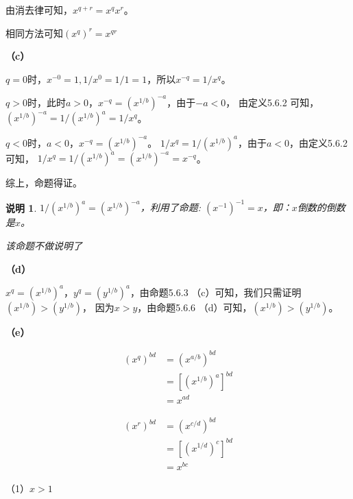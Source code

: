 \documentclass{article}
\theoremstyle{mystyle}
\newtheorem*{zremark}{说明}
\begin{document}
由消去律可知，$x^{q+r}=x^qx^r$。

相同方法可知$(x^q)^r = x^{qr}$

\textbf{（c）}

$q=0$时，$x^{-0}=1,1/x^0=1/1=1$，所以$x^{-q}=1/x^q$。

$q > 0$时，此时$a>0$，$x^{-q} = (x^{1/b})^{-a}$，由于$-a < 0$，
由定义5.6.2 可知，$(x^{1/b})^{-a} = 1/(x^{1/b})^{a} = 1/x^q$。

$q < 0$时，$a < 0$，$x^{-q} = (x^{1/b})^{-a}$。
$1/x^q = 1/(x^{1/b})^a$，由于$a<0$，由定义5.6.2 可知，
$1/x^q = 1/(x^{1/b})^a=(x^{1/b})^{-a}=x^{-q}$。

综上，命题得证。

\begin{zgraytheorem}
  \begin{zremark}
    $1/(x^{1/b})^a=(x^{1/b})^{-a}$，利用了命题: $(x^{-1})^{-1}=x$，即：$x$倒数的倒数是$x$。

    该命题不做说明了
  \end{zremark}
\end{zgraytheorem}

\textbf{（d）}

$x^q = (x^{1/b})^a$，$y^q=(y^{1/b})^a$，由命题5.6.3 （c）可知，我们只需证明$(x^{1/b})>(y^{1/b})$，
因为$x>y$，由命题5.6.6 （d）可知，$(x^{1/b})>(y^{1/b})$。

\textbf{（e）}

\begin{align*}
  (x^q)^{bd} & = (x^{a/b})^{bd}     \\
             & = [(x^{1/b})^a]^{bd} \\
             & = x^{ad}
\end{align*}

\begin{align*}
  (x^r)^{bd} & = (x^{c/d})^{bd}     \\
             & = [(x^{1/d})^c]^{bd} \\
             & = x^{bc}
\end{align*}

（1）$x > 1$
\end{document}
